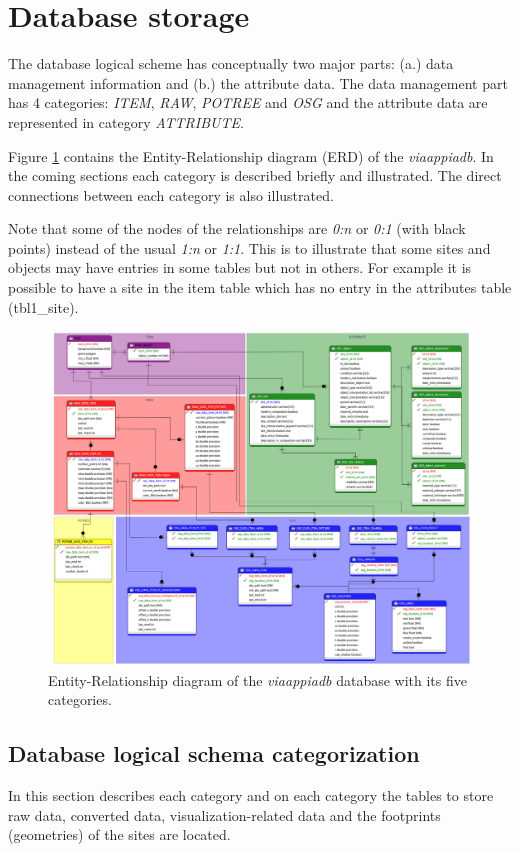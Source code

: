 \section{Database storage}
\label{sec:database}
The database logical scheme has conceptually two major parts: (a.) data management
information and (b.) the attribute data. The  data management part has 4 categories:
{\em ITEM}, {\em RAW}, {\em POTREE} and {\em OSG} and the attribute data are represented
in category {\em ATTRIBUTE}.
 
Figure \ref{fig:db_erdb} contains the Entity-Relationship diagram (ERD) of the
\textit{viaappiadb}. In the coming sections each category is described briefly and
illustrated. The direct connections between each category is also illustrated.

Note that some of the nodes of the relationships are \textit{0:n} or
\textit{0:1} (with black points) instead of the usual \textit{1:n} or
\textit{1:1}. This is to illustrate that some sites and objects may have
entries in some tables but not in others. For example it is possible to have a
site in the item table which has no entry in the attributes table (tbl1\_site).

\begin{figure}[H]
\centering
\includegraphics[scale=0.25]{fig/database/ERDB.pdf}
\caption{Entity-Relationship diagram of the \textit{viaappiadb} database with
its five categories.}
\label{fig:db_erdb}
\end{figure}

\subsection{Database logical schema categorization}
In this section describes each category and on each category the tables to store raw
data, converted data, visualization-related data and the footprints (geometries) of
the sites are located.

